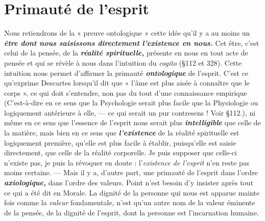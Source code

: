 \section{Primauté de l’esprit}%
Nous retiendrons de la « preuve
ontologique » cette idée qu’il y a au moins un \textbf{\textit {être dont nous saisissons
directement l'existence en nous.}} Cet être, c’est celui de la
pensée, de la \textbf{\textit {réalité spirituelle,}} présente en nous en tout acte de
pensée et qui se révèle à nous dans l'intuition du {\it cogito} (\S 112 et
328). Cette intuition nous permet d’affirmer la primauté \textbf{\textit {ontologique}}
de l'esprit. C’est ce qu’exprime Descartes lorsqu'il dit que
« l’âme est plus aisée à connaître que le corps », ce qui doit s’entendre,
non pas du tout d’une connaissance empirique
{\scriptsize (C'est-à-dire en ce sens que la Psychologie serait plus facile que la Physiologie ou
logiquement antérieure à elle, — ce qui serait un pur contresens ! Voir \S 112.)},
ni même en ce sens
que l’essence de l’esprit nous serait plus \textbf{\textit {intelligible}} que celle de la
matière, mais bien en ce sens que \textbf{\textit {l'existence}} de la réalité spirituelle
est logiquement première, qu’elle est plus facile à établir, puisqu’elle
est saisie directement, que celle de la réalité corporelle. Je puis supposer
que celle-ci n’existe pas, je puis la révoquer en doute : l’{\it existence
de l'esprit} n’en reste pas moins certaine. — Mais il y a, d’autre part,
une primauté de l'esprit dans l’ordre \textbf{\textit {axiologique,}} dans l’ordre des
valeurs. Point n’est besoin d’y insister après tout ce qui a été dit en
Morale. La dignité de la personne qui nous est apparue mainte fois
comme la {\it valeur} fondamentale, n’est qu’un autre nom de la valeur
éminente de la pensée, de la dignité de l’esprit, dont la personne est
l’incarnation humaine.

